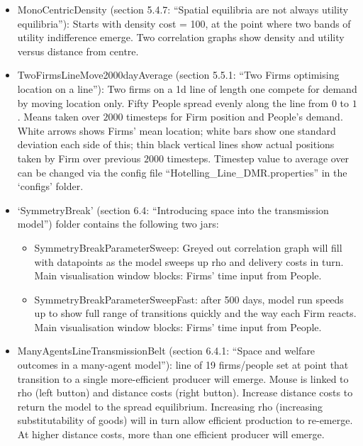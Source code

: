 \begin{itemize}

\item MonoCentricDensity (section 5.4.7: ``Spatial equilibria are not always utility equilibria''): Starts with density cost = 100, at the point where two bands of utility indifference emerge. Two correlation graphs show density and utility versus distance from centre. 

\item TwoFirmsLineMove2000dayAverage (section 5.5.1: ``Two Firms optimising location on a line''): Two firms on a 1d line of length one compete for demand by moving location only. Fifty People spread evenly along the line from $0$ to $1$. Means taken over $2000$ timesteps for Firm position and People's demand. White arrows shows Firms' mean location; white bars show one standard deviation each side of this; thin black vertical lines show actual positions taken by Firm over previous $2000$ timesteps. Timestep value to average over can be changed via the config file ``Hotelling\_Line\_DMR.properties'' in the `configs' folder.

\item `SymmetryBreak' (section 6.4: ``Introducing space into the transmission model'') folder contains the following two jars:

\begin{itemize}

\item SymmetryBreakParameterSweep: Greyed out correlation graph will fill with datapoints as the model sweeps up rho and delivery costs in turn. Main visualisation window blocks: Firms' time input from People.

\item SymmetryBreakParameterSweepFast: after 500 days, model run speeds up to show full range of transitions quickly and the way each Firm reacts. Main visualisation window blocks: Firms' time input from People.

\end{itemize}

\item ManyAgentsLineTransmissionBelt (section 6.4.1: ``Space and welfare outcomes in a many-agent model''): line of 19 firms/people set at point that transition to a single more-efficient producer will emerge. Mouse is linked to rho (left button) and distance costs (right button). Increase distance costs to return the model to the spread equilibrium. Increasing rho (increasing substitutability of goods) will in turn allow efficient production to re-emerge. At higher distance costs, more than one efficient producer will emerge.


\end{itemize}
